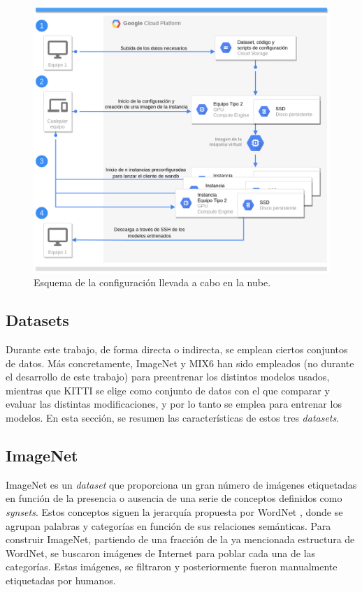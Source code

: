 \begin{figure}[H]
\centering
\includegraphics[width=\textwidth]{imagenes/cloud-diagram.png}
\caption{Esquema de la configuración llevada a cabo en la nube.}
\label{fig:cloud-diagram}
\end{figure}

\subsection{Datasets}
Durante este trabajo, de forma directa o indirecta, se emplean ciertos conjuntos de datos. Más concretamente, ImageNet \cite{imagenet_cvpr09, ILSVRC15} y MIX6 \cite{visiontransformersDPT} han sido empleados (no durante el desarrollo de este trabajo) para preentrenar los distintos modelos usados, mientras que KITTI \cite{KITTI-dataset, KITTI-benchmarks, KITTI-road-benchmark, KITTI-sceneflow-benchmark} se elige como conjunto de datos con el que comparar y evaluar las distintas modificaciones, y por lo tanto se emplea para entrenar los modelos. En esta sección, se resumen las características de estos tres \textit{datasets}.

\subsection{ImageNet}
ImageNet \cite{imagenet_cvpr09, ILSVRC15} es un \textit{dataset} que proporciona un gran número de imágenes etiquetadas en función de la presencia o ausencia de una serie de conceptos definidos como \textit{synsets}. Estos conceptos siguen la jerarquía propuesta por WordNet \cite{wordnet}, donde se agrupan palabras y categorías en función de sus relaciones semánticas. Para construir ImageNet, partiendo de una fracción de la ya mencionada estructura de WordNet, se buscaron imágenes de Internet para poblar cada una de las categorías. Estas imágenes, se filtraron y posteriormente fueron manualmente etiquetadas por humanos. 

